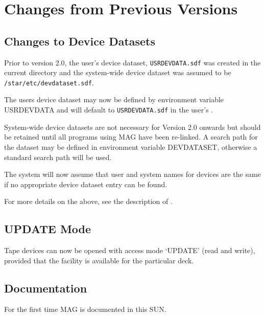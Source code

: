 \section{Changes from Previous Versions}
\subsection{Changes to Device Datasets}
Prior to version 2.0, the user's device dataset, {\tt USRDEVDATA.sdf} was
created in the current directory and the system-wide device dataset was assumed
to be {\tt /star/etc/devdataset.sdf}.

The users device dataset may now be defined by environment variable USRDEVDATA
and will default to {\tt USRDEVDATA.sdf} in the user's 
.

System-wide device datasets are not necessary for Version 2.0 onwards but 
should be retained until all programs using MAG have been re-linked.
A search path for the dataset may be defined in environment variable 
DEVDATASET, otherwise a standard search path will be used.

The system will now assume that user and system names for devices are the
same if no appropriate device dataset entry can be found.

For more details on the above, see the description of
.

\subsection{UPDATE Mode}
Tape devices can now be opened with access mode `UPDATE' (read and write),
provided that the facility is available for the particular deck.

\subsection{Documentation}
For the first time MAG is documented in this SUN.

